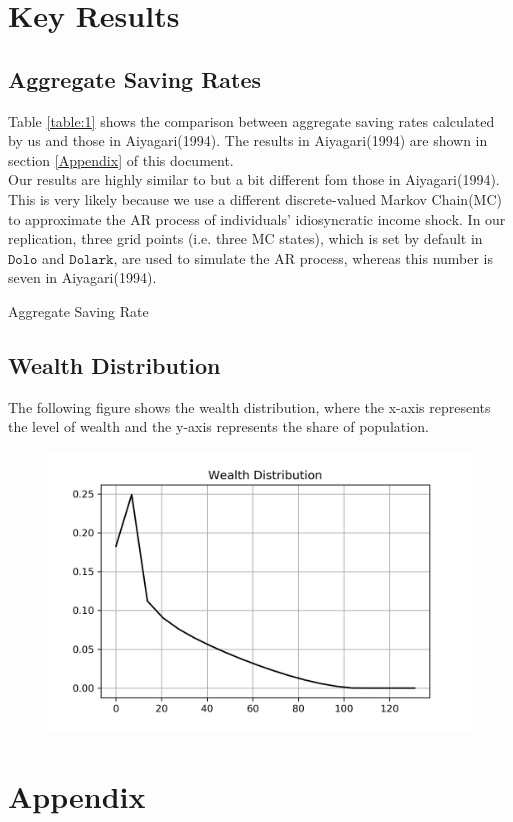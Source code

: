 \documentclass[]{article}
\providecommand{\RefDir}{References}
\begin{document}
\section{Key Results}
\subsection{Aggregate Saving Rates}
Table \ref{table:1} shows the comparison between aggregate saving rates calculated by us and those in Aiyagari(1994). The results in Aiyagari(1994) are shown in section \ref{Appendix} of this document.\\

Our results are highly similar to but a bit different fom those in Aiyagari(1994). This is very likely because we use a different discrete-valued Markov Chain(MC) to approximate the AR process of individuals' idiosyncratic income shock. In our replication, three grid points (i.e. three MC states), which is set by default in $\texttt{Dolo}$ and $\texttt{Dolark}$, are used to simulate the AR process, whereas this number is seven in Aiyagari(1994).
\begin{table}[H]
	\scalebox{.7}{}
	\caption{Aggregate Saving Rate}
	\label{table:2}
\end{table}


\subsection{Wealth Distribution}
The following figure shows the wealth distribution, where the x-axis represents the level of wealth and the y-axis represents the share of population.
\begin{figure}[H]
	\centering
	\includegraphics{Figures/Figure_WealthDistribution}
	\label{figure:1}
\end{figure}

\newpage
\section{Appendix}{\label{Appendix}}
	

\newpage 



\end{document}
